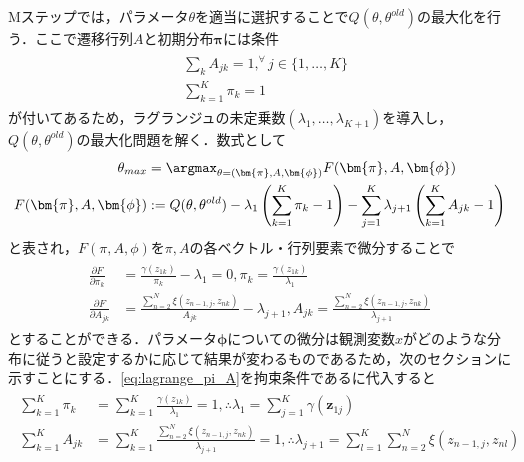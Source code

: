 \documentclass[dvipdfmx,autodetect-engine]{jsreport}
\begin{document}
Mステップでは，パラメータ$\theta$を適当に選択することで$Q(\theta,\theta^{old})$の最大化を行う．ここで遷移行列$A$と初期分布$\bm{\pi}$には条件
\begin{align}
    \begin{aligned}
        & \sum_{k}A_{jk} = 1, ^\forall j \in \{1,\dots,K\} \\
        & \sum_{k=1}^{K} \pi_k = 1
    \end{aligned}
\end{align}
が付いてあるため，ラグランジュの未定乗数$(\lambda_1,\dots,\lambda_{K+1})$を導入し，$Q(\theta,\theta^{old})$の最大化問題を解く．数式として
\begin{align}
	\begin{aligned}
        \theta_{max}    &=  \argmax_{\theta=(\bm{\pi},A,\bm{\phi})} F(\bm{\pi}, A, \bm{\phi}) \\ 
        F(\bm{\pi}, A, \bm{\phi}) &:= Q(\theta, \theta^{old}) - \lambda_1\left(\sum_{k=1}^{K} \pi_k - 1 \right) - \sum_{j=1}^{K} \lambda_{j+1} \left( \sum_{k=1}^{K} A_{jk} - 1 \right)\\ 
	\end{aligned}
\label{}
\end{align}
と表され，$F(\pi, A, \phi)$を$\pi,A$の各ベクトル・行列要素で微分することで
\begin{align}
	\begin{aligned}
		\frac{\partial F}{\partial \pi_k}  &= \frac{\gamma(z_{1k})}{\pi_k} - \lambda_1 = 0, 
			\pi_k = \frac{\gamma(z_{1k})}{\lambda_1}  \\
		\frac{\partial F}{\partial A_{jk}} &= \frac{\sum_{n=2}^{N} \xi(z_{n-1,j},z_{nk})}{A_{jk}} - \lambda_{j+1}, 
			A_{jk} = \frac{\sum_{n=2}^{N} \xi(z_{n-1,j},z_{nk})}{\lambda_{j+1}} 
	\end{aligned}
	\label{eq:lagrange_pi_A}
\end{align}
とすることができる．パラメータ$\bm{\phi}$についての微分は観測変数$x$がどのような分布に従うと設定するかに応じて結果が変わるものであるため，次のセクションに示すことにする．\eqref{eq:lagrange_pi_A}を拘束条件であるに代入すると
\begin{align}
	\begin{aligned}
		\sum_{k=1}^{K} \pi_k  &=  \sum_{k=1}^{K} \frac{\gamma(z_{1k})}{\lambda_1}  = 1,
			\therefore \lambda_1 = \sum_{j=1}^{K} \gamma(\bm{z}_{1j}) \\
		\sum_{k=1}^{K} A_{jk} &=  \sum_{k=1}^{K} \frac{\sum_{n=2}^{N} \xi(z_{n-1,j},z_{nk})}{\lambda_{j+1}} =1,
        \therefore \lambda_{j+1} = \sum_{l=1}^{K} \sum_{n=2}^{N} \xi(z_{n-1,j},z_{nl})
	\end{aligned}
	\label{eq:lagrange_lambda}
\end{align}
\end{document}
